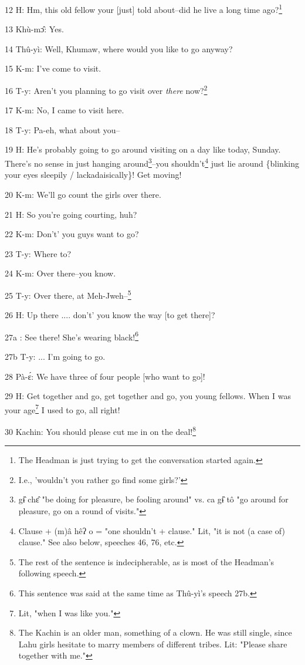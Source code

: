 
12 H: Hm, this old fellow your [just] told about--did he live a long time ago?\footnote{The Headman is just trying to get the conversation started again.}

13 Khù-mɔ̂: Yes.

14 Thû-yì: Well, Khumaw, where would you like to go anyway?

15 K-m: I've come to visit.

16 T-y: Aren't you planning to go visit over \textit{there} now?\footnote{I.e., 'wouldn't you rather go find some girls?'}

17 K-m: No, I came to visit here.

18 T-y: Pa-eh, what about you--

19 H: He's probably going to go around visiting on a day like today, Sunday. There's
no sense in just hanging around\footnote{gɨ̂ chɛ̂ "be doing for pleasure, be fooling around" vs. ca gɨ̂ tô "go around for pleasure, go on a round of visits."}--you shouldn't\footnote{Clause + (m)â hêʔ o =  "one shouldn't + clause." Lit, "it is not (a case of) clause." See also below, speeches 46, 76, etc.} just lie around \{blinking
your eyes sleepily / lackadaisically\}! Get moving!

20 K-m: We'll go count the girls over there.

21 H: So you're going courting, huh?

22 K-m: Don't' you guys want to go?

23 T-y: Where to?

24 K-m: Over there--you know.

25 T-y: Over there, at Meh-Jweh--\footnote{The rest of the sentence is indecipherable, as is most of the Headman's following speech.}

26 H: Up there .... don't' you know the way [to get there]?

27a  : See there! She's wearing black!\footnote{This sentence was said at the same time as Thû-yì's speech 27b.}

27b T-y: ... I'm going to go.

28 Pà-ɛ́: We have three of four people [who want to go]!

29 H: Get together and go, get together and go, you young fellows. When I was your
age\footnote{Lit, "when I was like you."} I used to go, all right!

30 Kachin: You should please cut me in on the deal!\footnote{The Kachin is an older man, something of a clown. He was still single, since Lahu girls hesitate to marry members of different tribes. Lit: "Please share together with me."}

